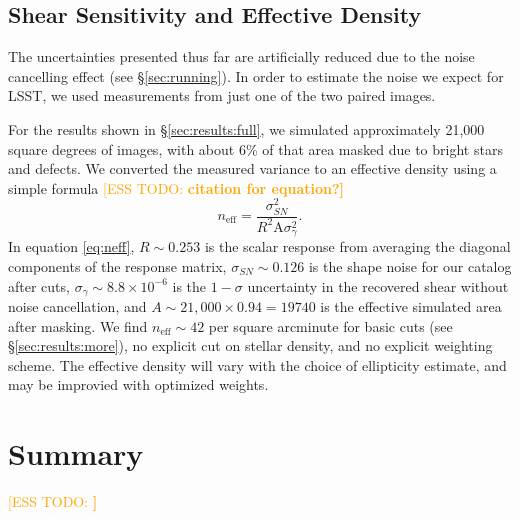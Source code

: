 \documentclass[iop, twocolappendix, appendixfloats, numberedappendix, apj]{hackemulateapj}
\newcommand{\esstodo}[1]{\textcolor{orange}{[ESS TODO: \bf #1]}}
\newcommand{\descwl}{\texttt{WeakLensingDeblending}}
\begin{document}
\subsection{Shear Sensitivity and Effective Density} \label{sec:results:effdens}

The uncertainties presented thus far are artificially reduced due to the noise
cancelling effect (see \S \ref{sec:running}).  In order to estimate the noise
we expect for LSST, we used measurements from just one of the two paired images.

For the results shown in \S \ref{sec:results:full}, we simulated approximately
21,000 square degrees of images, with about 6\% of that area masked due to
bright stars and defects.  We converted the measured variance to an
effective density using a simple formula \esstodo{citation for equation?}
\begin{equation} \label{eq:neff}
    n_{\mathrm{eff}} = \frac{\sigma^2_{SN}}{R^2 \mathrm{A} \sigma^2_{\gamma}}.
\end{equation}
In equation \ref{eq:neff}, $R \sim 0.253$ is the scalar response from averaging
the diagonal components of the response matrix, $\sigma_{SN} \sim 0.126$ is the
shape noise for our catalog after cuts, $\sigma_{\gamma} \sim 8.8 \times
10^{-6}$ is the $1-\sigma$ uncertainty in the recovered shear without noise cancellation,
and $A \sim 21,000 \times 0.94 = 19740$ is the effective simulated area after
masking.  We find $n_\mathrm{eff} \sim 42$
per square arcminute for basic cuts (see \S \ref{sec:results:more}), 
no explicit cut on stellar density, and no explicit weighting scheme.  The
effective density will vary with the choice of ellipticity estimate, and
may be improvied with optimized weights.



\section{Summary} \label{sec:summary}

\esstodo{}

% 

\end{document}
